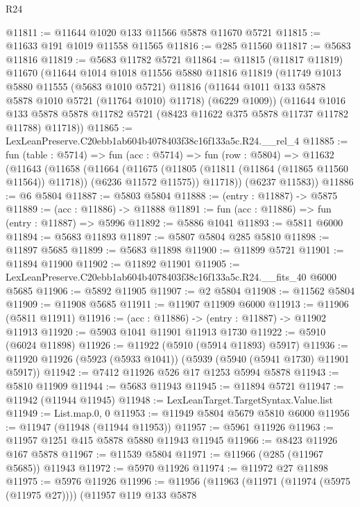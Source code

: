 \begin{lexlean}{R24}
\begin{coremodule}
@11811 := @11644 @1020 @133 @11566 @5878 @11670 @5721
@11815 := @11633 @191 @1019 @11558 @11565
@11816 := @285 @11560
@11817 := @5683 @11816
@11819 := @5683 @11782 @5721
@11864 := @11815
    (@11817 @11819)
    @11670
    (@11644
      @1014
      @1018
      @11556
      @5880
      @11816
      @11819
      (@11749
        @1013
        @5880
        @11555
        (@5683 @1010 @5721)
        @11816
        (@11644 @1011 @133 @5878 @5878 @1010 @5721 (@11764 @1010) @11718)
        (@6229 @1009))
      (@11644
        @1016
        @133
        @5878
        @5878
        @11782
        @5721
        (@8423 @11622 @375 @5878 @11737 @11782 @11788)
        @11718))
@11865 := LexLeanPreserve.C20ebb1ab604b4078403f38c16f133a5c.R24.__rel_4
@11885 := fun (table : @5714) =>
  fun (acc : @5714) =>
  fun (row : @5804) =>
  @11632
    (@11643
      (@11658
        (@11664
          (@11675 (@11805 (@11811 (@11864 (@11865 @11560 @11564)) @11718)) (@6236 @11572 @11575))
          @11718))
      (@6237 @11583))
@11886 := @6 @5804
@11887 := @5803 @5804
@11888 := (entry : @11887) -> @5875
@11889 := (acc : @11886) -> @11888
@11891 := fun (acc : @11886) => fun (entry : @11887) => @5996
@11892 := @5886 @1041
@11893 := @5811 @6000
@11894 := @5683 @11893
@11897 := @5807 @5804 @285 @5810
@11898 := @11897 @5685
@11899 := @5683 @11898
@11900 := @11899 @5721
@11901 := @11894 @11900
@11902 := @11892 @11901
@11905 := LexLeanPreserve.C20ebb1ab604b4078403f38c16f133a5c.R24.__fits_40 @6000 @5685
@11906 := @5892 @11905
@11907 := @2 @5804
@11908 := @11562 @5804
@11909 := @11908 @5685
@11911 := @11907 @11909 @6000
@11913 := @11906 (@5811 @11911)
@11916 := (acc : @11886) -> (entry : @11887) -> @11902 @11913
@11920 := @5903 @1041 @11901 @11913 @1730
@11922 := @5910 (@6024 @11898)
@11926 := @11922 (@5910 (@5914 @11893) @5917)
@11936 := @11920 @11926 (@5923 (@5933 @1041)) (@5939 (@5940 (@5941 @1730) @11901 @5917))
@11942 := @7412 @11926 @526 @17 @1253 @5994 @5878
@11943 := @5810 @11909
@11944 := @5683 @11943
@11945 := @11894 @5721
@11947 := @11942 (@11944 @11945)
@11948 := LexLeanTarget.TargetSyntax.Value.list
@11949 := List.map.{0, 0}
@11953 := @11949 @5804 @5679 @5810 @6000
@11956 := @11947 (@11948 (@11944 @11953))
@11957 := @5961 @11926
@11963 := @11957 @1251 @415 @5878 @5880 @11943 @11945
@11966 := @8423 @11926 @167 @5878
@11967 := @11539 @5804
@11971 := @11966 (@285 (@11967 @5685)) @11943
@11972 := @5970 @11926
@11974 := @11972 @27 @11898
@11975 := @5976 @11926
@11996 := @11956
    (@11963
      (@11971 (@11974 (@5975 (@11975 @27))))
      (@11957
        @119
        @133
        @5878

\end{coremodule}
\end{lexlean}
